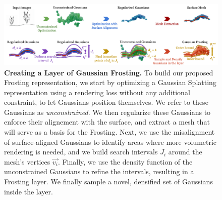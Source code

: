 \begin{figure}[tb]
  \centering
  \includegraphics[width=\linewidth]{images/pipeline_frosting_largefont.pdf}
  \caption{
  \textbf{Creating a Layer of Gaussian Frosting.} To build our proposed Frosting representation, we start by optimizing a Gaussian Splatting representation using a rendering loss without any additional constraint, to let Gaussians position themselves. We refer to these Gaussians as \emph{unconstrained}. We then regularize these Gaussians to enforce their alignement with the surface, and extract a mesh that will serve as a basis for the Frosting. Next, we use the misalignment of surface-aligned Gaussians to identify areas where more volumetric rendering is needed, and we build search intervals $J_i$ around the mesh's vertices $\vec{v_i}$. Finally, we use the density function of the unconstrained Gaussians to refine the intervals, resulting in a Frosting layer. We finally sample a novel, densified set of Gaussians inside the layer.
}
  \label{fig:frosting-pipeline}
\end{figure}